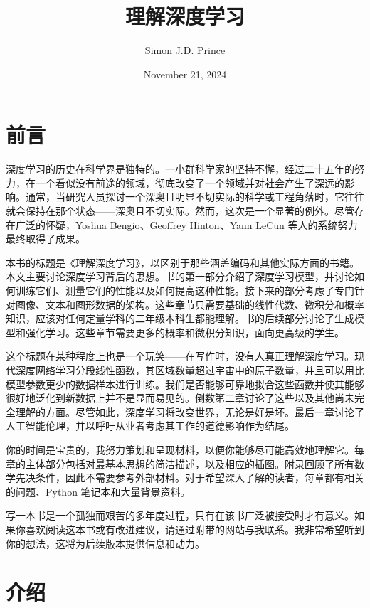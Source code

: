 \documentclass[lang=cn,newtx,10pt,scheme=chinese]{elegantbook}
\title{理解深度学习}
\author{Simon J.D. Prince}
\date{November 21, 2024}
\begin{document}
\maketitle
\frontmatter

\tableofcontents

\chapter{前言}

深度学习的历史在科学界是独特的。一小群科学家的坚持不懈，经过二十五年的努力，在一个看似没有前途的领域，彻底改变了一个领域并对社会产生了深远的影响。通常，当研究人员探讨一个深奥且明显不切实际的科学或工程角落时，它往往就会保持在那个状态——深奥且不切实际。然而，这次是一个显著的例外。尽管存在广泛的怀疑，Yoshua Bengio、Geoffrey Hinton、Yann LeCun 等人的系统努力最终取得了成果。

本书的标题是《理解深度学习》，以区别于那些涵盖编码和其他实际方面的书籍。本文主要讨论深度学习背后的思想。书的第一部分介绍了深度学习模型，并讨论如何训练它们、测量它们的性能以及如何提高这种性能。接下来的部分考虑了专门针对图像、文本和图形数据的架构。这些章节只需要基础的线性代数、微积分和概率知识，应该对任何定量学科的二年级本科生都能理解。书的后续部分讨论了生成模型和强化学习。这些章节需要更多的概率和微积分知识，面向更高级的学生。

这个标题在某种程度上也是一个玩笑——在写作时，没有人真正理解深度学习。现代深度网络学习分段线性函数，其区域数量超过宇宙中的原子数量，并且可以用比模型参数更少的数据样本进行训练。我们是否能够可靠地拟合这些函数并使其能够很好地泛化到新数据上并不是显而易见的。倒数第二章讨论了这些以及其他尚未完全理解的方面。尽管如此，深度学习将改变世界，无论是好是坏。最后一章讨论了人工智能伦理，并以呼吁从业者考虑其工作的道德影响作为结尾。

你的时间是宝贵的，我努力策划和呈现材料，以便你能够尽可能高效地理解它。每章的主体部分包括对最基本思想的简洁描述，以及相应的插图。附录回顾了所有数学先决条件，因此不需要参考外部材料。对于希望深入了解的读者，每章都有相关的问题、Python 笔记本和大量背景资料。

写一本书是一个孤独而艰苦的多年度过程，只有在该书广泛被接受时才有意义。如果你喜欢阅读这本书或有改进建议，请通过附带的网站与我联系。我非常希望听到你的想法，这将为后续版本提供信息和动力。

\mainmatter

\chapter{介绍}
\end{document}
